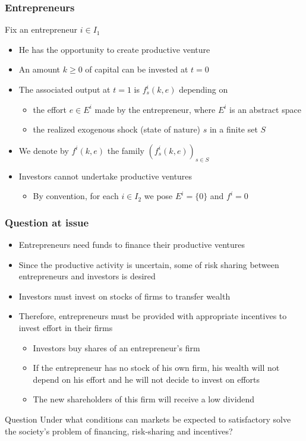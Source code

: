 \documentclass[blue]{beamer}
\def\geq{\geqslant}
\theoremstyle{definition}
\theoremstyle{example}
\begin{document}

\begin{frame}\frametitle{Entrepreneurs}

Fix an entrepreneur $i\in I_1$
\begin{itemize}
\item He has the opportunity to create productive venture
\item An amount $k\geq 0$ of capital can be invested at $t=0$
\item The associated output at $t=1$ is $f^i_s(k,e)$ depending on
    \begin{itemize}
    \item the effort $e \in E^i$ made by the entrepreneur, where $E^i$ is an abstract space
    \item the realized exogenous shock (state of nature) $s$ in a finite set $S$
    \end{itemize}
\item We denote by $f^i(k,e)$ the family $(f^i_s(k,e))_{s\in S}$
\item Investors cannot undertake productive ventures
    \begin{itemize}
    \item By convention, for each $i\in I_2$ we pose $E^i=\{0\}$ and $f^i=0$
    \end{itemize}
\end{itemize}

\end{frame}


\begin{frame}\frametitle{Question at issue}

\begin{itemize}
\item Entrepreneurs need funds to finance their productive ventures
\item Since the productive activity is uncertain, some of risk sharing between entrepreneurs and investors is desired
\item Investors must invest on stocks of firms to transfer wealth
\item Therefore, entrepreneurs must be provided with appropriate incentives to invest effort in their firms
    \begin{itemize}
    \item Investors buy shares of an entrepreneur's firm
    \item If the entrepreneur has no stock of his own firm, his wealth will not depend on his effort and he will not decide to invest on efforts
    \item The new shareholders of this firm will receive a low dividend
    \end{itemize}
\end{itemize}

\begin{block}{Question}
Under what conditions can markets be expected to satisfactory solve the society's problem of financing, risk-sharing and incentives?
\end{block}

\end{frame}
\end{document}
